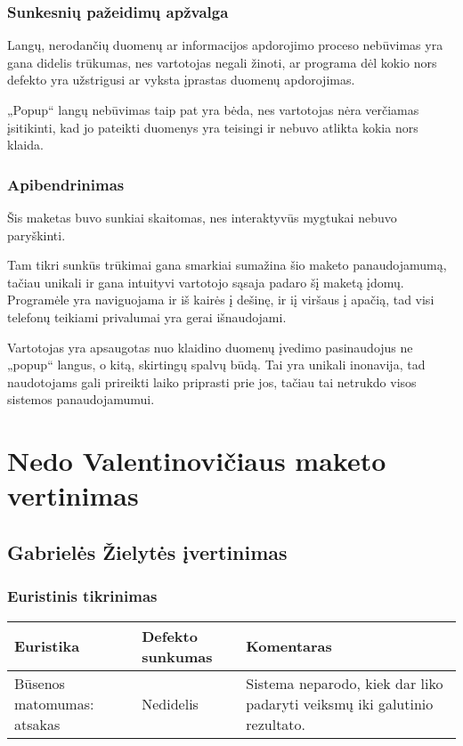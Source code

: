 \documentclass{VUMIFPSkursinis}
\begin{document}
\subsubsection{Sunkesnių pažeidimų apžvalga}
Langų, nerodančių duomenų ar informacijos apdorojimo proceso nebūvimas yra gana didelis trūkumas, nes vartotojas negali žinoti, ar programa dėl kokio nors defekto yra užstrigusi ar vyksta įprastas duomenų apdorojimas.

„Popup“ langų nebūvimas taip pat yra bėda, nes vartotojas nėra verčiamas įsitikinti, kad jo pateikti duomenys yra teisingi ir nebuvo atlikta kokia nors klaida.

\subsubsection{Apibendrinimas}
Šis maketas buvo sunkiai skaitomas, nes interaktyvūs mygtukai nebuvo paryškinti. 

Tam tikri sunkūs trūkimai gana smarkiai sumažina šio maketo panaudojamumą, tačiau unikali ir gana intuityvi vartotojo sąsaja padaro šį maketą įdomų. Programėle yra naviguojama ir iš kairės į dešinę, ir iį viršaus į apačią, tad visi telefonų teikiami privalumai yra gerai išnaudojami. 

Vartotojas yra apsaugotas nuo klaidino duomenų įvedimo pasinaudojus ne „popup“ langus, o kitą, skirtingų spalvų būdą. Tai yra unikali inonavija, tad naudotojams gali prireikti laiko priprasti prie jos, tačiau tai netrukdo visos sistemos panaudojamumui.

\section{Nedo Valentinovičiaus maketo vertinimas}
\subsection{Gabrielės Žielytės įvertinimas}
\subsubsection{Euristinis tikrinimas}
\begin{center}
 \begin{tabular}{|| p{4cm} | p{4cm} | p{8cm} ||} 
 \hline
 Euristika & Defekto sunkumas & Komentaras \\
 \hline\hline
 Būsenos matomumas: atsakas & Nedidelis & Sistema neparodo, kiek dar liko padaryti veiksmų iki galutinio rezultato.\\ 
 \hline
\end{tabular}	
\end{center}
\end{document}
